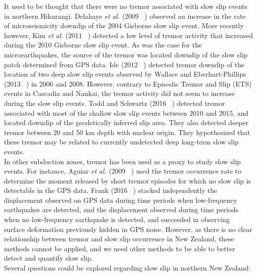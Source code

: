 \documentclass[letterpaper, 12pt]{article}
\begin{document}
It used to be thought that there were no tremor associated with slow slip events in northern Hikurangi. Delahaye \textit{et al.} (2009 ~\cite{DEL_2009}) observed an increase in the rate of microseismicity downdip of the 2004 Gisborne slow slip event. More recently however, Kim \textit{et al.} (2011 ~\cite{KIM_2011}) detected a low level of tremor activity that increased during the 2010 Gisborne slow slip event. As was the case for the microearthquakes, the source of the tremor was located downdip of the slow slip patch determined from GPS data. Ide (2012 ~\cite{IDE_2012}) detected tremor downdip of the location of two deep slow slip events observed by Wallace and Eberhart-Phillips (2013 ~\cite{WAL_2013}) in 2006 and 2008. However, contrary to Episodic Tremor and Slip (ETS) events in Cascadia and Nankai, the tremor activity did not seem to increase during the slow slip events. Todd and Schwartz (2016 ~\cite{TOD_2016}) detected tremor associated with most of the shallow slow slip events between 2010 and 2015, and located downdip of the geodetically inferred slip area. They also detected deeper tremor between 20 and 50 km depth with unclear origin. They hypothesized that these tremor may be related to currently undetected deep long-term slow slip events.\\

In other subduction zones, tremor has been used as a proxy to study slow slip events. For instance, Aguiar \textit{et al.} (2009 ~\cite{AGU_2009}) used the tremor occurrence rate to determine the moment released by short tremor episodes for which no slow slip is detectable in the GPS data. Frank (2016 ~\cite{FRA_2016_GRL}) stacked independently the displacement observed on GPS data during time periods when low-frequency earthquakes are detected, and the displacement observed during time periods when no low-frequency earthquake is detected, and succeeded in observing surface deformation previously hidden in GPS noise. However, as there is no clear relationship between tremor and slow slip occurrence in New Zealand, these methods cannot be applied, and we need other methods to be able to better detect and quantify slow slip.\\

Several questions could be explored regarding slow slip in northern New Zealand:
\end{document}
